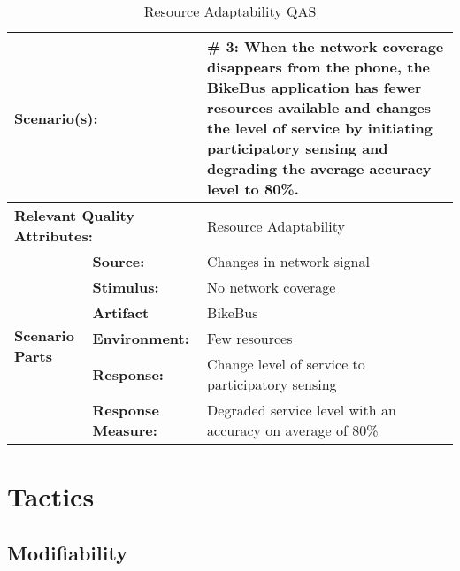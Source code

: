 \begin{table}[H]
\begin{center}
\begin{tabular}{|p{0.3cm}|p{2.5cm}|p{8cm}|}
  \hline
  \multicolumn{2}{|p{3cm}|}{\bfseries Scenario(s):} & \#  3: When the network coverage disappears from the phone, the BikeBus application has fewer resources available and changes the level of service by initiating participatory sensing and degrading the average accuracy level to 80\%. \\
  \hline
  \multicolumn{2}{|p{3cm}|}{\bfseries Relevant Quality Attributes:} & Resource Adaptability\\
  \hline
  \multirow{6}{*}{\begin{sideways}{\bfseries Scenario Parts}\end{sideways}}
  & {\bfseries Source:} & Changes in network signal \\
  \cline{2-3}
  & {\bfseries Stimulus:} & No network coverage  \\
  \cline{2-3}
  & {\bfseries Artifact} &  BikeBus \\
  \cline{2-3}
  & {\bfseries Environment:} &  Few resources \\
  \cline{2-3}
  & {\bfseries Response:} &  Change level of service to participatory sensing\\
  \cline{2-3}
  & {\bfseries Response Measure:} & Degraded service level with an accuracy on average of 80\%\\
  \hline
\end{tabular}
\caption{Resource Adaptability QAS}
\end{center}
\end{table}


\section{Tactics}

\subsection{Modifiability}

